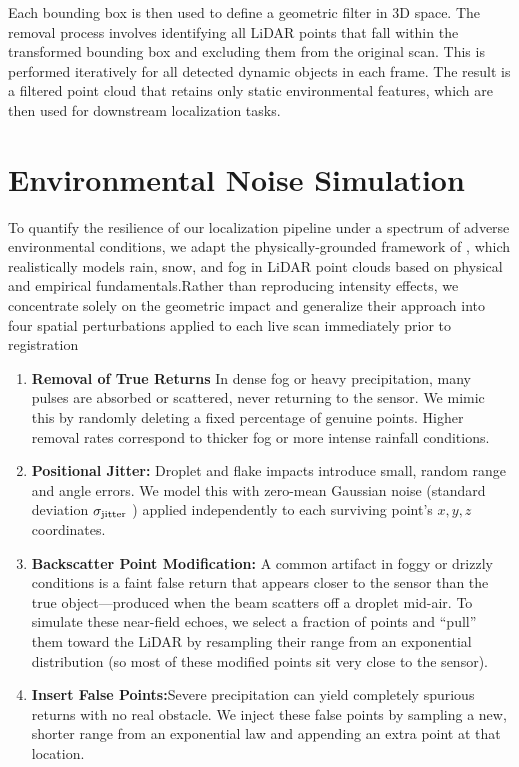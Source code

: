 Each bounding box is then used to define a geometric filter in 3D space. The removal process involves identifying all LiDAR points that fall within the transformed bounding box and excluding them from the original scan. This is performed iteratively for all detected dynamic objects in each frame. The result is a filtered point cloud that retains only static environmental features, which are then used for downstream localization tasks. 


\section{Environmental Noise Simulation}
\label{sec:env_noise_sim}


To quantify the resilience of our localization pipeline under a spectrum of adverse environmental conditions, we adapt the physically‐grounded framework of \cite{teufel2022realistic}, which realistically models rain, snow, and fog in LiDAR point clouds
 based on physical and empirical fundamentals.Rather than reproducing intensity effects, we concentrate solely on the geometric impact and generalize their approach into four spatial perturbations applied to each live scan immediately prior to registration



\begin{enumerate}
	\item \textbf{Removal of True Returns}
	In dense fog or heavy precipitation, many pulses are absorbed or scattered, never returning to the sensor. We mimic this by randomly deleting a fixed percentage of genuine points. Higher removal rates correspond to thicker fog or more intense rainfall conditions. 
	\item \textbf{Positional Jitter:} Droplet and flake impacts introduce small, random range and angle errors. We model this with zero-mean Gaussian noise  (standard deviation $\sigma_{\rm jitter}$ ) applied independently to each surviving point's $x,y,z$ coordinates.
	
	\item \textbf{Backscatter Point Modification:} A common artifact in foggy or drizzly conditions is a faint false return that appears closer to the sensor than the true object—produced when the beam scatters off a droplet mid-air. To simulate these near-field echoes, we select a fraction of points and “pull” them toward the LiDAR by resampling their range from an exponential distribution (so most of these modified points sit very close to the sensor).
	
	\item \textbf{Insert False Points:}Severe precipitation can yield completely spurious returns with no real obstacle. We inject these false points  by sampling a new, shorter range from an exponential law and appending an extra point at that location. 
	
\end{enumerate}

